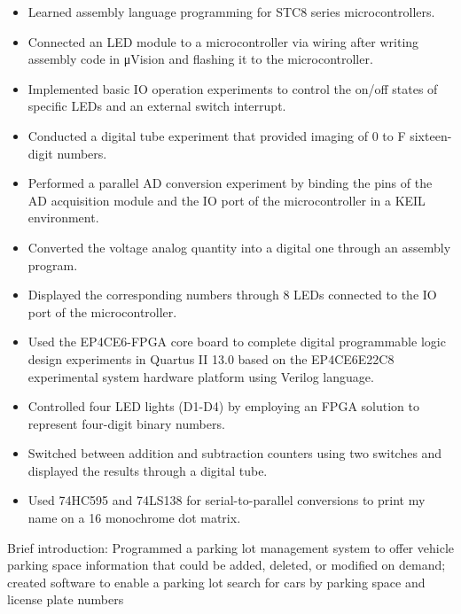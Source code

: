 \documentclass[12pt]{resume}
\begin{document}
\begin{itemize}
  \item Learned assembly language programming for STC8 series microcontrollers.
  \item Connected an LED module to a microcontroller via wiring after writing assembly code in μVision and flashing it to the microcontroller.
  \item Implemented basic IO operation experiments to control the on/off states of specific LEDs and an external switch interrupt.
  \item Conducted a digital tube experiment that provided imaging of 0 to F sixteen-digit numbers.
  \item Performed a parallel AD conversion experiment by binding the pins of the AD acquisition module and the IO port of the microcontroller in a KEIL environment.
  \item Converted the voltage analog quantity into a digital one through an assembly program.
  \item Displayed the corresponding numbers through 8 LEDs connected to the IO port of the microcontroller.
\end{itemize}

\begin{itemize}
  \item Used the EP4CE6-FPGA core board to complete digital programmable logic design experiments in Quartus II 13.0 based on the EP4CE6E22C8 experimental system hardware platform using Verilog language.
  \item Controlled four LED lights (D1-D4) by employing an FPGA solution to represent four-digit binary numbers.
  \item Switched between addition and subtraction counters using two switches and displayed the results through a digital tube.
  \item Used 74HC595 and 74LS138 for serial-to-parallel conversions to print my name on a 16 monochrome dot matrix.
\end{itemize}

Brief introduction: Programmed a parking lot management system to offer vehicle parking space information that could be added, deleted, or modified on demand; created software to enable a parking lot search for cars by parking space and license plate numbers
\end{document}
